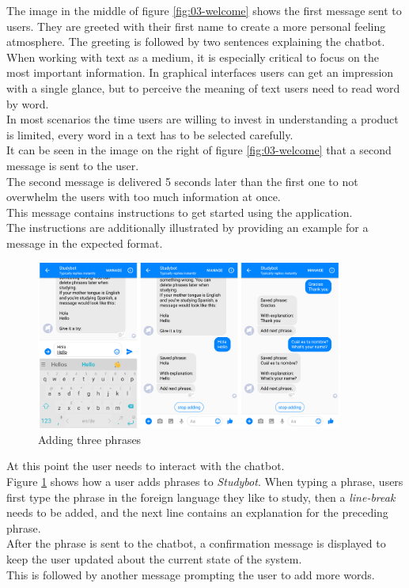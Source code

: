 The image in the middle of figure \ref{fig:03-welcome} shows the first message sent to users.
They are greeted with their first name to create a more personal feeling atmosphere.
The greeting is followed by two sentences explaining the chatbot.
\\
When working with text as a medium, it is especially critical to focus on the most important information.
In graphical interfaces users can get an impression with a single glance,
but to perceive the meaning of text users need to read word by word.
\\
In most scenarios the time users are willing to invest in understanding a product is limited,
every word in a text has to be selected carefully.
\\

It can be seen in the image on the right of figure \ref{fig:03-welcome} that a second message is sent to the user.
\\
The second message is delivered 5 seconds later than the first one to not overwhelm the users with too much information at once.
\\
This message contains instructions to get started using the application.
\\
The instructions are additionally illustrated by providing an example for a message in the expected format.
\\

\begin{figure}[h]
  \centering
  \includegraphics[width=0.9\textwidth]{images/interface/04-add.png}
	\caption{Adding three phrases}
	\label{fig:04-add}
\end{figure}

At this point the user needs to interact with the chatbot.
\\
Figure \ref{fig:04-add} shows how a user adds phrases to \emph{Studybot}.
When typing a phrase, users first type the phrase in the foreign language they like to study,
then a \emph{line-break} needs to be added,
and the next line contains an explanation for the preceding phrase.
\\
After the phrase is sent to the chatbot,
a confirmation message is displayed to keep the user updated about the current state of the system.
\\
This is followed by another message prompting the user to add more words.
\\

